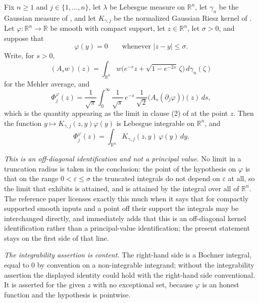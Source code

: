 \begin{lemma}
Fix $n \geq 1$ and $j \in \{1,\ldots,n\}$, let $\lambda$ be Lebesgue measure on
$\mathbb{R}^n$, let $\gamma_n$ be the Gaussian measure of , and let
$K_{\gamma,j}$ be the normalized Gaussian Riesz kernel of .  Let
$\varphi : \mathbb{R}^n \to \mathbb{R}$ be smooth with compact support, let
$z \in \mathbb{R}^n$, let $\sigma > 0$, and suppose that
\[
  \varphi(y) = 0 \qquad\text{whenever } |z-y| \leq \sigma .
\]
Write, for $s > 0$,
\[
  (A_sw)(z) = \int_{\mathbb{R}^n} w\bigl(e^{-s}z + \sqrt{1-e^{-2s}}\,\zeta\bigr)\,d\gamma_n(\zeta)
\]
for the Mehler average, and
\[
  \Phi_j^\varphi(z) = \frac{1}{\sqrt\pi}\int_0^\infty
      \frac{1}{\sqrt s}\,e^{-s}\,\frac{1}{\sqrt2}
      \bigl(A_s(\partial_j\varphi)\bigr)(z)\,ds ,
\]
which is the quantity appearing as the limit in clause (2) of  at the
point $z$.  Then the function $y \mapsto K_{\gamma,j}(z,y)\varphi(y)$ is Lebesgue integrable on
$\mathbb{R}^n$, and
\[
  \Phi_j^\varphi(z) = \int_{\mathbb{R}^n}K_{\gamma,j}(z,y)\,\varphi(y)\,dy .
\]

\emph{This is an off-diagonal identification and not a principal value.}  No limit in a
truncation radius is taken in the conclusion: the point of the hypothesis on $\varphi$ is that
on the range $0 < \varepsilon \leq \sigma$ the truncated integrals do not depend on
$\varepsilon$ at all, so the limit that  exhibits is attained, and is
attained by the integral over all of $\mathbb{R}^n$.  The reference paper licenses exactly this
much when it says that for compactly supported smooth inputs and a point off their support the
integrals may be interchanged directly, and immediately adds that this is an off-diagonal kernel
identification rather than a principal-value identification; the present statement stays on the
first side of that line.

\emph{The integrability assertion is content.}  The right-hand side is a Bochner integral, equal
to $0$ by convention on a non-integrable integrand; without the integrability assertion the
displayed identity could hold with the right-hand side conventional.  It is asserted for the
given $z$ with no exceptional set, because $\varphi$ is an honest function and the hypothesis is
pointwise.
\end{lemma}
